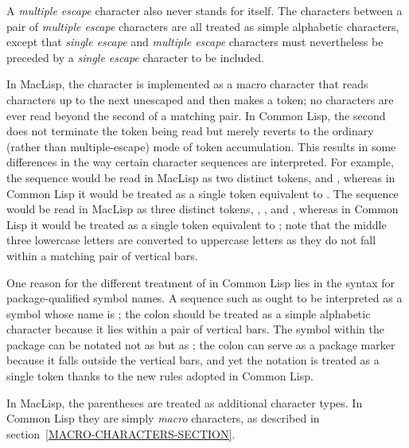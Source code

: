 A {\it multiple escape} character also never stands for itself.  The characters
between a pair of {\it multiple escape} characters are all treated as
simple alphabetic characters, except that {\it single escape} and
{\it multiple escape} characters must nevertheless be preceded by
a {\it single escape} character to be included.

\beforenoterule
\begin{incompatibility}
In MacLisp, the \cd{|} character is implemented
as a macro character that reads characters up to the next unescaped
\cd{|} and then makes a token; no characters are ever read beyond
the second \cd{|} of a matching pair.
In Common Lisp, the second \cd{|} does not terminate the token being read
but merely reverts to the ordinary (rather than multiple-escape) mode
of token accumulation.  This results in some differences in the way
certain character sequences are interpreted.  For example,
the sequence  would be read in MacLisp
as two distinct tokens,  and , whereas in Common Lisp
it would be treated as a single token equivalent to .
The sequence  would be read in MacLisp
as three distinct tokens, , , and , whereas in Common Lisp
it would be treated as a single token equivalent to ;
note that the middle three lowercase letters are converted to
uppercase letters as they
do not fall within a matching pair of vertical bars.

One reason for the different treatment of \cd{|} in Common Lisp lies
in the syntax for package-qualified symbol names.  A sequence such as
 ought to be interpreted as a symbol whose name is
; the colon should be treated as a simple alphabetic
character because it lies within a pair of vertical bars.  The symbol
 within the package  can be notated not as 
but as ; the colon can serve as a package marker because
it falls outside the vertical bars, and yet the notation is treated as a single
token thanks to the new rules adopted in Common Lisp.

\goodbreak

In MacLisp, the parentheses are treated as
additional character types.  In Common Lisp they are simply {\it macro} characters,
as described in section~\ref{MACRO-CHARACTERS-SECTION}.


\end{incompatibility}

